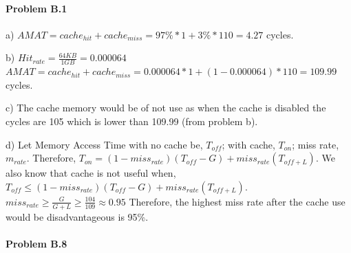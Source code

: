 \documentclass[11pt]{article}
\begin{document}
\MakeScribeTop


\paragraph{\noindent\textbf{\LARGE{Problem B.1}}}


\begin{flushleft}
    a) $AMAT = cache_{hit} + cache_{miss} = 97\% * 1 + 3\% * 110 = 4.27$ cycles.
    \newline
    
    b) $Hit_{rate} = \frac{64 KB}{1 GB} = 0.000064$ 
    \newline
    $AMAT = cache_{hit} + cache_{miss} = 0.000064 * 1 + (1 - 0.000064) * 110 = 109.99$ cycles.
    \newline

    c) The cache memory would be of not use as when the cache is disabled the cycles are 105 which is lower than 109.99 (from problem b).
    \newline

    d) Let Memory Access Time with no cache be, $T_{off}$; with cache, $T_{on}$; miss rate, $m_{rate}$.
    \newline
    \newline
    Therefore,
    \newline
    $T_{on} = (1 - miss_{rate})(T_{off} - G) + miss_{rate}(T_{off + L})$.
    \newline
    \newline
    We also know that cache is not useful when,
    \newline
    $T_{off}  \leq (1 - miss_{rate})(T_{off} - G) + miss_{rate}(T_{off + L})$.
    \newline
    $miss_{rate} \geq \frac{G}{G+L} \geq \frac{104}{109} \approx 0.95$
    \newline
    Therefore, the highest miss rate after the cache use would be disadvantageous is 95\%.
\end{flushleft}   


\paragraph{\noindent\textbf{\LARGE{Problem B.8}}}
\end{document}
